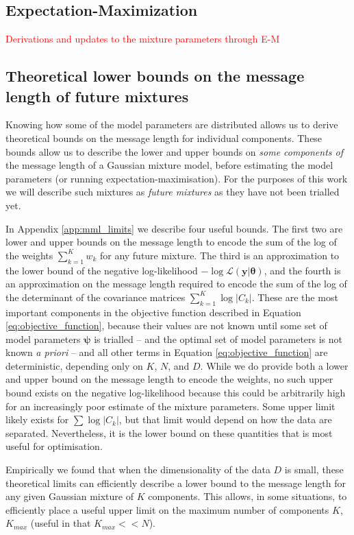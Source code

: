 \documentclass{elsarticle}
\newcommand{\todo}[1]{\textcolor{red}{#1}}
\newcommand{\vect}[1]{\boldsymbol{\mathbf{#1}}}
\renewcommand{\vec}[1]{\vect{#1}}
\def\cov{C}
\def\weight{w}
\def\datum{y}
\def\data{\vect{\datum}}
\begin{document}
\subsection{Expectation-Maximization}

\todo{Derivations and updates to the mixture parameters through E-M}

\subsection{Theoretical lower bounds on the message length of future mixtures}

Knowing how some of the model parameters are distributed allows us to derive theoretical
bounds on the message length for individual components. These bounds allow us to describe
the lower and upper bounds on \emph{some components of} the message length of a Gaussian mixture
model, before estimating the model parameters (or running expectation-maximisation). For the
purposes of this work we will describe such mixtures as \emph{future mixtures} as they have
not been trialled yet. 

In Appendix \ref{app:mml_limits} we describe four useful bounds. The first two are lower and upper bounds on the   message length to encode the sum of the log of the weights $\sum_{k=1}^{K}\weight_k$
for any future mixture. The third is an approximation to the lower bound of the negative log-likelihood $-\log\mathcal{L}\left(\vec{\data}|\vec{\theta}\right)$, and the fourth is an approximation on the message length required to encode
the sum of the log of the determinant of the covariance matrices $\sum_{k=1}^{K}\log|\cov_k|$. These are the  most important components in the objective function described
in Equation \ref{eq:objective_function}, because their values are not known until some set of model parameters $\vec{\psi}$ is trialled -- and the optimal set of model parameters is not known \emph{a priori} -- and all other terms in Equation \ref{eq:objective_function} are deterministic, depending only on $K$, $N$, and $D$.
While we do provide both a lower and upper bound on the message length to encode the weights, no such upper bound exists on the
negative log-likelihood because this could be arbitrarily high for an increasingly poor estimate of the mixture
parameters. Some upper limit likely exists for $\sum\log|\cov_k|$, but that limit would depend on how the data are separated. Nevertheless, it is the lower bound on these quantities that is most useful for optimisation.


Empirically we found that when the dimensionality of the data $D$ is small, these theoretical limits can efficiently describe a lower bound to the message length for any given Gaussian mixture of $K$ components. This allows, in some situations, to efficiently place a useful upper limit on the maximum number of components $K$, $K_{max}$ (useful in that $K_{max} << N$). 
\end{document}
